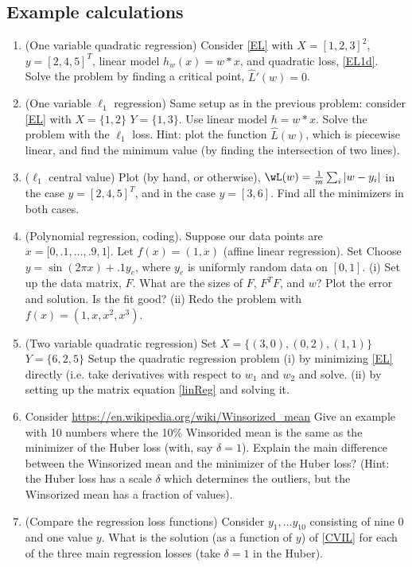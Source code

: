 \documentclass[12pt]{amsart}
\begin{document}
\subsection{Example calculations}
\begin{enumerate}
	\item (One variable quadratic regression) Consider \eqref{EL} with $X = [ 1, 2, 3 ]^2$,   $y = [ 2, 4, 5 ]^T$,  linear model $h_w(x) = w*x$, and quadratic loss, \eqref{EL1d}. Solve the problem by finding a critical point, $\hat L'(w) = 0$.
	\item (One variable $\ell_1$ regression) Same setup as in the previous problem: consider \eqref{EL} with $X = \{ 1, 2 \}$  $Y = \{ 1, 3 \}$.  Use linear model $h = w*x$.  Solve the problem with the $\ell_1$ loss.  Hint: plot the function $\hat L(w)$, which is piecewise linear, and find the minimum value (by finding the intersection of  two lines).  
	\item ($\ell_1$ central value)  Plot (by hand, or otherwise), $\wL(w) = \frac 1 m \sum_i |w - y_i|$ in the case $y = [ 2, 4, 5 ]^T$, and in the case $y = [3, 6]$.  Find all the minimizers in both cases. 
	\item (Polynomial regression, coding).  Suppose our data points are $x = [0, .1, \dots, .9, 1$].  Let $f(x) = (1, x)$ (affine linear regression).  Set Choose $y = \sin(2\pi x) + .1 y_e$, where $y_e$ is uniformly random data on $[0,1]$.  (i) Set up the data matrix, $F$. What are the sizes of $F$,  $F^TF$, and $w$?  Plot the error and solution.  Is the fit good?   (ii) Redo the problem with 	$f(x) = (1, x, x^2, x^3)$. 
	\item (Two variable quadratic regression) Set $X = \{ (3,0), (0,2), (1,1) \}$ $Y = \{ 6, 2, 5 \}$ Setup the quadratic regression problem (i) by minimizing \eqref{EL} directly (i.e. take derivatives with respect to $w_1$ and $w_2$ and solve.   (ii) by setting up the matrix equation \eqref{linReg} and solving it. 
 	\item Consider \url{https://en.wikipedia.org/wiki/Winsorized_mean}  Give an example with 10 numbers where the 10\% Winsorided mean is the same as the minimizer of the Huber loss (with, say $\delta = 1$).  Explain the main difference between the Winsorized mean and the minimizer of the Huber loss? (Hint: the Huber loss has a scale $\delta$ which determines the outliers, but the Winsorized mean has a fraction of values). 
 	\item (Compare the regression loss functions) Consider $y_1, \dots y_{10}$ consisting of nine 0 and one value $y$.  What is the solution (as a function of $y$) of \eqref{CVIL} for each of the three main regression losses (take $\delta = 1$ in the Huber). 
\end{enumerate}
\end{document}
